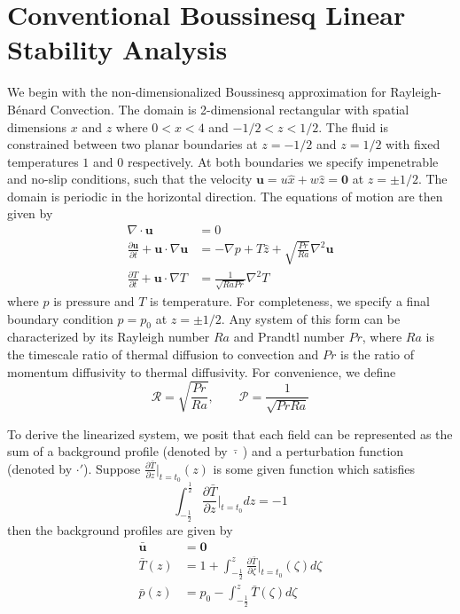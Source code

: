 \documentclass[reprint,amsmath,amssymb,aps]{revtex4-1}
\begin{document}
\section{Conventional Boussinesq Linear Stability Analysis}\label{sec:boussinesq}
We begin with the non-dimensionalized Boussinesq approximation for Rayleigh-Bénard Convection. The domain is 2-dimensional rectangular with spatial dimensions $x$ and $z$ where $0 < x < 4$ and $-1/2 < z < 1/2$. The fluid is constrained between two planar boundaries at $z = -1/2$ and $z = 1/2$ with fixed temperatures $1$ and $0$ respectively. At both boundaries we specify impenetrable and no-slip conditions, such that the velocity $\mathbf{u} = u \hat{x} + w \hat{z} = \mathbf{0}$ at $z = \pm 1/2$. The domain is periodic in the horizontal direction. The equations of motion are then given by
\begin{align}
    \nabla \cdot \mathbf{u} &= 0 \label{EQ:motion1}\\
    \frac{\partial \mathbf{u}}{\partial t} + \mathbf{u} \cdot \nabla \mathbf{u} &= - \nabla p + T \hat{z} + \sqrt{\frac{Pr}{Ra}} \nabla^2 \mathbf{u} \label{EQ:motion2}\\
    \frac{\partial T}{\partial t} + \mathbf{u} \cdot \nabla T &= \frac{1}{\sqrt{RaPr}} \nabla^2 T \label{EQ:motion3}
\end{align}
where $p$ is pressure and $T$ is temperature. For completeness, we specify a final boundary condition $p = p_0$ at $z = \pm 1/2$. Any system of this form can be characterized by its Rayleigh number $Ra$ and Prandtl number $Pr$, where $Ra$ is the timescale ratio of thermal diffusion to convection and $Pr$ is the ratio of momentum diffusivity to thermal diffusivity.  For convenience, we define 
\begin{equation}
\mathcal{R} = \sqrt{\frac{Pr}{Ra}}, \qquad \mathcal{P} = \frac{1}{\sqrt{Pr Ra}}
\end{equation}
\par To derive the linearized system, we posit that each field can be represented as the sum of a background profile (denoted by $\bar{\cdot } \;$) and a perturbation function (denoted by $\cdot'$). Suppose $\frac{\partial \bar{T}}{\partial z}\big|_{t=t_0} (z)$ is some given function which satisfies
\begin{equation}
    \int_{-\frac{1}{2}}^{\frac{1}{2}} \frac{\partial \bar{T}}{\partial z}\Big|_{t=t_0} dz = -1
\end{equation}
then the background profiles are given by
\begin{align}
    \mathbf{\bar{u}} &= \mathbf{0} \\
    \bar{T}(z) &= 1 + \int_{-\frac{1}{2}}^{z} \frac{\partial \bar{T}}{\partial \zeta}\Big|_{t=t_0}(\zeta) d\zeta \\
    \bar{p}(z) &= p_0 - \int_{-\frac{1}{2}}^z \bar{T}(\zeta) d\zeta
\end{align}
\end{document}
